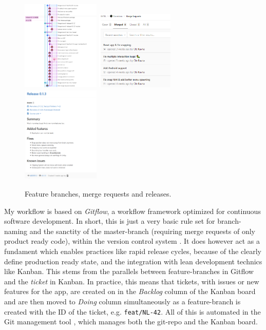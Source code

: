 \begin{figure}[h]
    \includegraphics[width=0.33\textwidth]{fig/gitkraken_gitlog}
    \includegraphics[width=0.33\textwidth]{fig/mergerequests}
    \includegraphics[width=0.33\textwidth]{fig/release_gitlab}
    \caption{Feature branches, merge requests and releases.}
\end{figure}

My workflow is based on \textit{Gitflow}, a workflow framework optimized for continuous software development. In short, this is just a very basic rule set for branch-naming and the sanctity of the master-branch (requiring merge requests of only product ready code), within the version control system . It does however act as a fundament which enables practices like rapid release cycles, because of the clearly define production ready state, and the integration with lean development technics like Kanban. This stems from the parallels between feature-branches in Gitflow and the \textit{ticket} in Kanban. In practice, this means that tickets, with issues or new features for the app, are created on in the \textit{Backlog} column of the Kanban board and are then moved to \textit{Doing} column simultaneously as a feature-branch is created with the ID of the ticket, e.g. \texttt{feat/NL-42}. All of this is automated in the Git management tool , which manages both the git-repo and the Kanban board.

